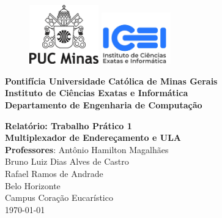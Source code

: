 \thispagestyle{empty} %

\begin{figure}[t]
    \includegraphics[width=3cm]{images/logo-puc-minas.png}
    \hspace{0.02\textwidth}
    \vline%
    \hspace{0.04\textwidth}
    \includegraphics[width=3cm]{images/logo-icei.jpeg}
\end{figure}

\hrulefill%
\vspace{\baselineskip}

\Large\noindent
\textbf{Pontifícia Universidade Católica de Minas Gerais} \\
\textbf{Instituto de Ciências Exatas e Informática} \\
\textbf{Departamento de Engenharia de Computação}

\begin{center}
    \vfill
    \Huge\textbf{Relatório: Trabalho Prático 1} \\
    \vspace{0.5cm}
    \Large\textbf{Multiplexador de Endereçamento e ULA} \\
    \vspace{1cm}
    \large \textbf{Professores}: Antônio Hamilton Magalhães\\
    \vspace{0.5cm}
    \large Bruno Luiz Dias Alves de Castro \\
    \large Rafael Ramos de Andrade \\
    \vfill
    \large Belo Horizonte \\ Campus Coração Eucarístico \\
    \vspace{\baselineskip}
    \large \today
\end{center}